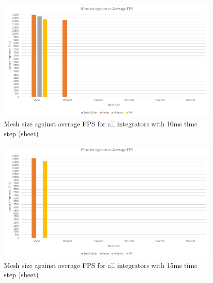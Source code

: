 \begin{landscape}
    \begin{figure}[!htb]
    \begin{center}
      \includegraphics{Figures/sheet_10ms_int_fps}
    \end{center}
    \caption{Mesh size against average FPS for all integrators with 10ms time step (sheet)}
    \label{fig:10ms fps sheet}
  \end{figure}

    \begin{figure}[!htb]
    \begin{center}
      \includegraphics{Figures/sheet_15ms_int_fps}
    \end{center}
    \caption{Mesh size against average FPS for all integrators with 15ms time step (sheet)}
    \label{fig:15ms fps sheet}
  \end{figure}
  

\end{landscape}
